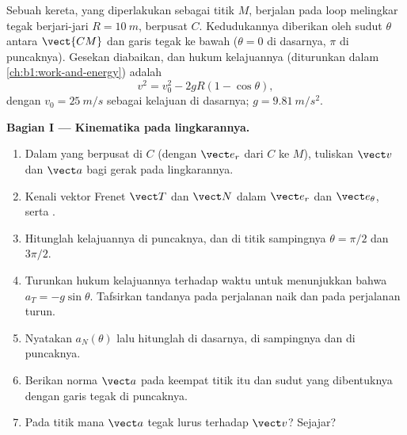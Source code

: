 \begin{problem}
\label{pb:b1:point-kinematics:1}
Sebuah kereta, yang diperlakukan sebagai titik $M$, berjalan pada loop
melingkar tegak berjari-jari $R = \qty{10}{m}$, berpusat $C$.
Kedudukannya diberikan oleh sudut $\theta$ antara $\vect{CM}$ dan garis
tegak ke bawah ($\theta =
0$ di dasarnya, $\pi$ di puncaknya). Gesekan
diabaikan, dan hukum kelajuannya (diturunkan dalam
\cref{ch:b1:work-and-energy}) adalah
\[
v^2 = v_0^2 - 2gR(1 - \cos\theta),
\]
dengan $v_0 = \qty{25}{m/s}$ sebagai kelajuan di dasarnya; $g = \qty{9.81}{m/s^2}$.

\medskip
\noindent\textbf{Bagian I --- Kinematika pada lingkarannya.}
\begin{enumerate}
  \item Dalam  yang berpusat di $C$ (dengan $\vect e_r$
        dari $C$ ke $M$), tuliskan $\vect v$ dan $\vect a$ bagi gerak
        pada lingkarannya.
  \item Kenali vektor Frenet $\vect T$ dan $\vect N$ dalam
        $\vect e_r$ dan $\vect e_\theta$, serta .
  \item Hitunglah kelajuannya di puncaknya, dan di titik sampingnya
        $\theta = \pi/2$ dan $3\pi/2$.
  \item Turunkan hukum kelajuannya terhadap waktu untuk menunjukkan
        bahwa  $a_T = -g\sin\theta$. Tafsirkan
        tandanya pada perjalanan naik dan pada perjalanan turun.
  \item Nyatakan  $a_N(\theta)$ lalu hitunglah di
        dasarnya, di sampingnya dan di puncaknya.
  \item Berikan norma $\vect a$ pada keempat titik itu dan sudut yang
        dibentuknya dengan garis tegak di puncaknya.
  \item Pada titik mana $\vect a$ tegak lurus terhadap $\vect v$? Sejajar?
\end{enumerate}


\end{problem}
